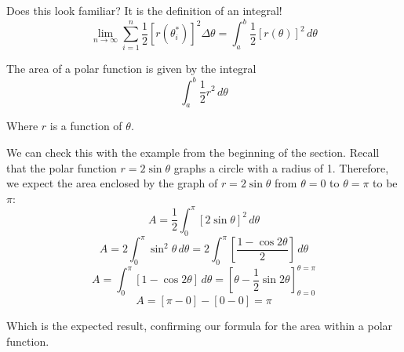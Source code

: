 Does this look familiar? It is the definition of an integral!
$$\lim_{n \to \infty} \sum_{i = 1}^n \frac{1}{2} \left[ r( \theta_i^*) \right] 
^2 \Delta \theta = \int_a^b \frac{1}{2} \left[ r(\theta) \right]^2\,d\theta$$

\begin{mdframed}[style=important, frametitle={Area of a Polar Function}]
The area of a polar function is given by the integral 
$$\int_a^b \frac{1}{2} r^2\,d\theta$$

Where $r$ is a function of $\theta$. 
\end{mdframed}

We can check this with the example from the beginning of the section. Recall 
that the polar function $r =  2\sin{\theta}$ graphs a circle with a radius of 
1. Therefore, we expect the area enclosed by the graph of $r = 2\sin{\theta}$ 
from $\theta = 0$ to $\theta = \pi$ to be $\pi$:
$$A = \frac{1}{2} \int_0^{\pi} \left[ 2\sin{\theta} \right]^2\,d\theta$$
$$A = 2 \int_0^{\pi} \sin^2{\theta}\,d\theta = 2 \int_0^{\pi} \left[ \frac{1 - 
\cos{2\theta}}{2} \right]\,d\theta$$
$$A = \int_0^{\pi} \left[ 1 - \cos{2\theta} \right]\,d\theta = \left[\theta - 
\frac{1}{2}\sin{2\theta} \right]_{\theta = 0}^{\theta = \pi}$$
$$A = \left[\pi - 0 \right] - \left[0 - 0 \right] = \pi$$

Which is the expected result, confirming our formula for the area within a 
polar function. 

